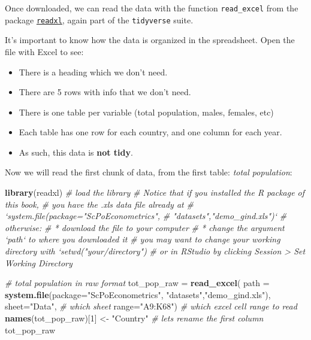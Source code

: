 \documentclass[]{book}
\newenvironment{Shaded}{\begin{snugshade}}{\end{snugshade}}
\newcommand{\KeywordTok}[1]{\textcolor[rgb]{0.13,0.29,0.53}{\textbf{#1}}}
\newcommand{\DataTypeTok}[1]{\textcolor[rgb]{0.13,0.29,0.53}{#1}}
\newcommand{\DecValTok}[1]{\textcolor[rgb]{0.00,0.00,0.81}{#1}}
\newcommand{\StringTok}[1]{\textcolor[rgb]{0.31,0.60,0.02}{#1}}
\newcommand{\CommentTok}[1]{\textcolor[rgb]{0.56,0.35,0.01}{\textit{#1}}}
\newcommand{\NormalTok}[1]{#1}
\providecommand{\tightlist}{%
  \setlength{\itemsep}{0pt}\setlength{\parskip}{0pt}}
\begin{document}
Once downloaded, we can read the data with the function
\texttt{read\_excel} from the package
\href{http://readxl.tidyverse.org}{\texttt{readxl}}, again part of the
\texttt{tidyverse} suite.

It's important to know how the data is organized in the spreadsheet.
Open the file with Excel to see:

\begin{itemize}
\tightlist
\item
  There is a heading which we don't need.
\item
  There are 5 rows with info that we don't need.
\item
  There is one table per variable (total population, males, females,
  etc)
\item
  Each table has one row for each country, and one column for each year.
\item
  As such, this data is \textbf{not tidy}.
\end{itemize}

Now we will read the first chunk of data, from the first table:
\emph{total population}:

\begin{Shaded}
\begin{Highlighting}[]
\KeywordTok{library}\NormalTok{(readxl)  }\CommentTok{# load the library}
\CommentTok{# Notice that if you installed the R package of this book,}
\CommentTok{# you have the .xls data file already at }
\CommentTok{# `system.file(package="ScPoEconometrics",}
\CommentTok{#                        "datasets","demo_gind.xls")`}
\CommentTok{# otherwise:}
\CommentTok{# * download the file to your computer}
\CommentTok{# * change the argument `path` to where you downloaded it}
\CommentTok{# you may want to change your working directory with `setwd("your/directory")}
\CommentTok{# or in RStudio by clicking Session > Set Working Directory}

\CommentTok{# total population in raw format}
\NormalTok{tot_pop_raw =}\StringTok{ }\KeywordTok{read_excel}\NormalTok{(}
                \DataTypeTok{path =} \KeywordTok{system.file}\NormalTok{(}\DataTypeTok{package=}\StringTok{"ScPoEconometrics"}\NormalTok{,}
                                    \StringTok{"datasets"}\NormalTok{,}\StringTok{"demo_gind.xls"}\NormalTok{), }
                \DataTypeTok{sheet=}\StringTok{"Data"}\NormalTok{, }\CommentTok{# which sheet}
                \DataTypeTok{range=}\StringTok{"A9:K68"}\NormalTok{)  }\CommentTok{# which excel cell range to read}
\KeywordTok{names}\NormalTok{(tot_pop_raw)[}\DecValTok{1}\NormalTok{] <-}\StringTok{ "Country"}   \CommentTok{# lets rename the first column}
\NormalTok{tot_pop_raw}
\end{Highlighting}
\end{Shaded}
\end{document}
